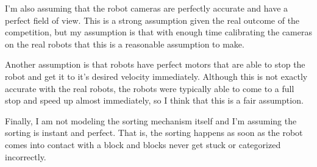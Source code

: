 \documentclass[12pt]{article}
\begin{document}
I'm also assuming that the robot cameras are perfectly accurate and have a perfect field of view. This is a strong assumption given the real outcome of the competition, but my assumption is that with enough time calibrating the cameras on the real robots that this is a reasonable assumption to make.

Another assumption is that robots have perfect motors that are able to stop the robot and get it to it's desired velocity immediately. Although this is not exactly accurate with the real robots, the robots were typically able to come to a full stop and speed up almost immediately, so I think that this is a fair assumption.

Finally, I am not modeling the sorting mechanism itself and I'm assuming the sorting is instant and perfect. That is, the sorting happens as soon as the robot comes into contact with a block and blocks never get stuck or categorized incorrectly. 
\end{document}
